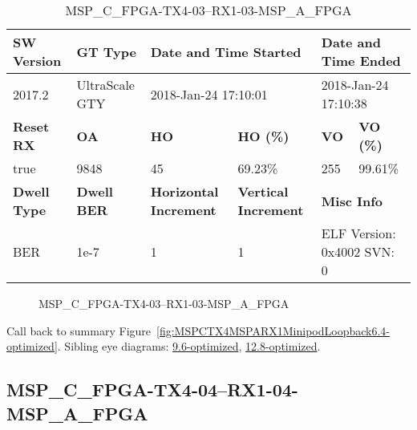 \begin{table}[h]
\centering
\caption{MSP\_C\_FPGA-TX4-03--RX1-03-MSP\_A\_FPGA}
\label{tab:MSPCFPGATX403RX103MSPAFPGA6.4-optimized}
\begin{tabular}{@{}|l|l|l|l|l|l|@{}}
\toprule
\textbf{SW Version}                & \textbf{GT Type}   & \multicolumn{2}{l|}{\textbf{Date and Time Started}}            & \multicolumn{2}{l|}{\textbf{Date and Time Ended}}        \\ \midrule
2017.2                       & UltraScale GTY          & \multicolumn{2}{l|}{2018-Jan-24 17:10:01}                   & \multicolumn{2}{l|}{2018-Jan-24 17:10:38}               \\ \midrule
\textbf{Reset RX}                  & \textbf{OA} & \textbf{HO}   & \textbf{HO (\%)} & \textbf{VO} & \textbf{VO (\%)} \\ \midrule
true & 9848        & 45          & 69.23\%        & 255        & 99.61\%       \\ \midrule
\textbf{Dwell Type}                & \textbf{Dwell BER} & \textbf{Horizontal Increment} & \textbf{Vertical Increment}    & \multicolumn{2}{l|}{\textbf{Misc Info}}                  \\ \midrule
BER                            & 1e-7        & 1        & 1           & \multicolumn{2}{l|}{ELF Version: 0x4002 SVN: 0}                         \\ \bottomrule
\end{tabular}
\end{table}

\begin{figure}[h]
\caption{MSP\_C\_FPGA-TX4-03--RX1-03-MSP\_A\_FPGA} \label{fig:MSPCFPGATX403RX103MSPAFPGA6.4-optimized}
\end{figure}

Call back to summary Figure~\ref{fig:MSPCTX4MSPARX1MinipodLoopback6.4-optimized}.
Sibling eye diagrams: \hyperref[sec:MSPCFPGATX403RX103MSPAFPGA9.6-optimized]{9.6-optimized}, \hyperref[sec:MSPCFPGATX403RX103MSPAFPGA12.8-optimized]{12.8-optimized}.

\clearpage
\newpage


\subsection{MSP\_C\_FPGA-TX4-04--RX1-04-MSP\_A\_FPGA}\label{sec:MSPCFPGATX404RX104MSPAFPGA6.4-optimized}

